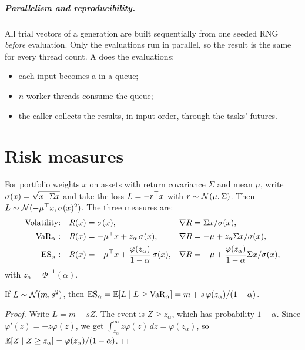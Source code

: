 \paragraph{Parallelism and reproducibility.} All trial vectors of a generation are built
sequentially from one seeded RNG \emph{before} evaluation. Only the evaluations run in
parallel, so the result is the same for every thread count. A 
does the evaluations:
\begin{itemize}
  \item each input becomes a  in a queue;
  \item $n$ worker threads consume the queue;
  \item the caller collects the results, in input order, through the tasks' futures.
\end{itemize}
\begin{codepointers}
\end{codepointers}

\chapter{Risk measures}\label{c:sec:risk}

For portfolio weights $x$ on assets with return covariance $\Sigma$ and mean $\mu$, write
$\sigma(x)=\sqrt{x^\top\Sigma x}$ and take the loss $L=-r^\top x$ with $r\sim\mathcal{N}(\mu,\Sigma)$. Then
$L\sim\mathcal{N}(-\mu^\top x,\sigma(x)^2)$. The three measures are:
\begin{align*}
  \text{Volatility:}\quad & R(x)=\sigma(x), & \nabla R &= \Sigma x/\sigma(x),\\
  \text{VaR}_\alpha:\quad & R(x)=-\mu^\top x+z_\alpha\,\sigma(x), & \nabla R&=-\mu+z_\alpha\Sigma x/\sigma(x),\\
  \text{ES}_\alpha:\quad & R(x)=-\mu^\top x+\frac{\varphi(z_\alpha)}{1-\alpha}\,\sigma(x), & \nabla R&=-\mu+\frac{\varphi(z_\alpha)}{1-\alpha}\Sigma x/\sigma(x),
\end{align*}
with $z_\alpha=\Phi^{-1}(\alpha)$.

\begin{proposition}
If $L\sim\mathcal{N}(m,s^2)$, then
$\mathrm{ES}_\alpha=\mathbb{E}[L\mid L\ge\mathrm{VaR}_\alpha]=m+s\,\varphi(z_\alpha)/(1-\alpha)$.
\end{proposition}
\begin{proof}
Write $L=m+sZ$. The event is $Z\ge z_\alpha$, which has probability $1-\alpha$. Since
$\varphi'(z)=-z\varphi(z)$, we get $\int_{z_\alpha}^\infty z\varphi(z)\,dz=\varphi(z_\alpha)$,
so $\mathbb{E}[Z\mid Z\ge z_\alpha]=\varphi(z_\alpha)/(1-\alpha)$.
\end{proof}

